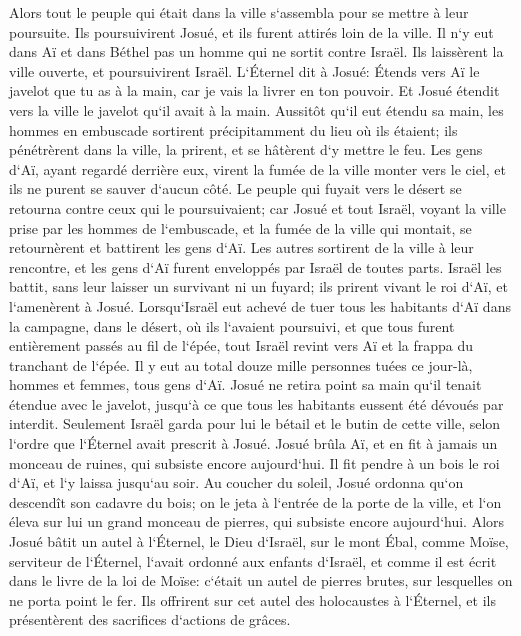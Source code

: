 \verse Alors tout le peuple qui était dans la ville s`assembla pour se mettre à leur poursuite. Ils poursuivirent Josué, et ils furent attirés loin de la ville. 
\verse Il n`y eut dans Aï et dans Béthel pas un homme qui ne sortit contre Israël. Ils laissèrent la ville ouverte, et poursuivirent Israël. 
\verse L`Éternel dit à Josué: Étends vers Aï le javelot que tu as à la main, car je vais la livrer en ton pouvoir. Et Josué étendit vers la ville le javelot qu`il avait à la main. 
\verse Aussitôt qu`il eut étendu sa main, les hommes en embuscade sortirent précipitamment du lieu où ils étaient; ils pénétrèrent dans la ville, la prirent, et se hâtèrent d`y mettre le feu. 
\verse Les gens d`Aï, ayant regardé derrière eux, virent la fumée de la ville monter vers le ciel, et ils ne purent se sauver d`aucun côté. Le peuple qui fuyait vers le désert se retourna contre ceux qui le poursuivaient; 
\verse car Josué et tout Israël, voyant la ville prise par les hommes de l`embuscade, et la fumée de la ville qui montait, se retournèrent et battirent les gens d`Aï. 
\verse Les autres sortirent de la ville à leur rencontre, et les gens d`Aï furent enveloppés par Israël de toutes parts. Israël les battit, sans leur laisser un survivant ni un fuyard; 
\verse ils prirent vivant le roi d`Aï, et l`amenèrent à Josué. 
\verse Lorsqu`Israël eut achevé de tuer tous les habitants d`Aï dans la campagne, dans le désert, où ils l`avaient poursuivi, et que tous furent entièrement passés au fil de l`épée, tout Israël revint vers Aï et la frappa du tranchant de l`épée. 
\verse Il y eut au total douze mille personnes tuées ce jour-là, hommes et femmes, tous gens d`Aï. 
\verse Josué ne retira point sa main qu`il tenait étendue avec le javelot, jusqu`à ce que tous les habitants eussent été dévoués par interdit. 
\verse Seulement Israël garda pour lui le bétail et le butin de cette ville, selon l`ordre que l`Éternel avait prescrit à Josué. 
\verse Josué brûla Aï, et en fit à jamais un monceau de ruines, qui subsiste encore aujourd`hui. 
\verse Il fit pendre à un bois le roi d`Aï, et l`y laissa jusqu`au soir. Au coucher du soleil, Josué ordonna qu`on descendît son cadavre du bois; on le jeta à l`entrée de la porte de la ville, et l`on éleva sur lui un grand monceau de pierres, qui subsiste encore aujourd`hui. 
\verse Alors Josué bâtit un autel à l`Éternel, le Dieu d`Israël, sur le mont Ébal, 
\verse comme Moïse, serviteur de l`Éternel, l`avait ordonné aux enfants d`Israël, et comme il est écrit dans le livre de la loi de Moïse: c`était un autel de pierres brutes, sur lesquelles on ne porta point le fer. Ils offrirent sur cet autel des holocaustes à l`Éternel, et ils présentèrent des sacrifices d`actions de grâces. 
